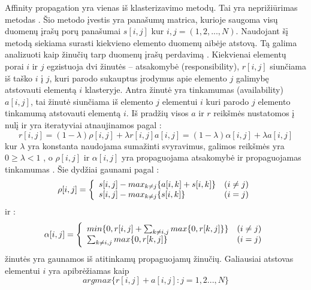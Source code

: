 Affinity propagation yra vienas iš klasterizavimo metodų. Tai yra neprižiūrimas metodas \cite{comp}. Šio metodo įvestis yra panašumų matrica, kurioje saugoma visų duomenų įrašų porų panašumai $s[i, j]$ kur $i, j =  (1,  2, ..., N)$. Naudojant šį metodą siekiama surasti kiekvieno elemento duomenų aibėje atstovą. Tą galima analizuoti kaip žinučių tarp duomenų įrašų perdavimą \cite{fastprop}. Kiekvienai elementų porai $i$ ir $j$ egzistuoja dvi žinutės -- atsakomybė (responsibility), $r[i, j]$ siunčiama iš taško $i$ į $j$, kuri parodo sukauptus įrodymus apie elemento $j$ galimybę atstovauti elementą $i$ klasteryje.  Antra žinutė yra tinkamumas (availability) $a[i, j]$, tai žinutė siunčiama iš elemento $j$ elementui $i$ kuri parodo $j$ elemento tinkamumą atstovauti elementą $i$. Iš pradžių visos $a$ ir $r$ reikšmės nustatomos į nulį ir yra iteratyviai atnaujinamos pagal \cite{fastprop}:
 \begin{equation}
    r[i, j] = (1 - \lambda)\rho[i, j] + \lambda r[i, j]
    a[i, j] = (1 - \lambda)\alpha[i, j] + \lambda a[i, j]
 \end{equation}
 kur $\lambda$ yra konstanta naudojama sumažinti svyravimus, galimos reikšmės yra $ 0 \geq \lambda < 1 $ , o $\rho[i, j]$ ir  $\alpha[i, j]$ yra propaguojama atsakomybė ir propaguojamas tinkamumas \cite{fastprop}. Šie dydžiai gaunami pagal \cite{fastprop}:
 \begin{equation}
   \rho[i, j]=\left\{
                  \begin{array}{l r}
                    s[i,j] - max_{k \neq j} \{ {a[i, k] + s[i, k]} \} & (i \neq j) \\
                    s[i,j] - max_{k \neq j} \{ {s[i, k]} \} & (i = j) \\
                  \end{array}
                \right.
 \end{equation}
   ir \cite{fastprop}:
\begin{equation}
    \alpha[i, j] =  \left\{
         \begin{array}{l r}
            min \{ 0, r[i, j] + \sum_{k \neq i,j} max \{ 0, r[k, j] \} \}         & (i \neq j) \\
            \sum_{k \neq i,j} max \{ 0, r[k, j] \}  & (i = j) \\
         \end{array}
       \right.
\end{equation}
žinutės yra gaunamos iš atitinkamų propaguojamų žinučių. Galiausiai atstovas elementui $i$ yra apibrėžiamas kaip \cite{fastprop}
\begin{equation}
    argmax \{r[i, j] + a[i, j] : j = 1, 2 ..., N \}
\end{equation}


